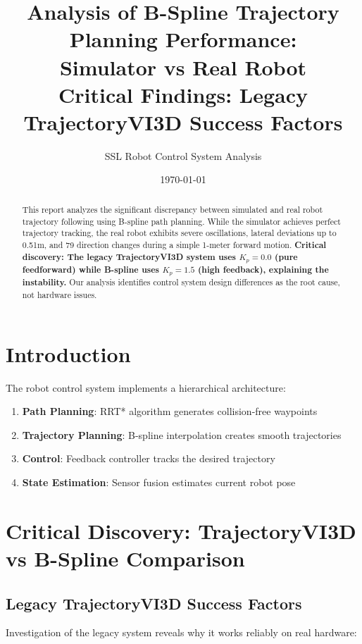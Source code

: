 \documentclass[12pt,a4paper]{article}
\title{Analysis of B-Spline Trajectory Planning Performance:\\Simulator vs Real Robot\\
\large{\textbf{Critical Findings: Legacy TrajectoryVI3D Success Factors}}}
\author{SSL Robot Control System Analysis}
\date{\today}
\begin{document}
\maketitle

\begin{abstract}
This report analyzes the significant discrepancy between simulated and real robot trajectory following using B-spline path planning. While the simulator achieves perfect trajectory tracking, the real robot exhibits severe oscillations, lateral deviations up to 0.51m, and 79 direction changes during a simple 1-meter forward motion. \textbf{Critical discovery: The legacy TrajectoryVI3D system uses $K_p = 0.0$ (pure feedforward) while B-spline uses $K_p = 1.5$ (high feedback), explaining the instability.} Our analysis identifies control system design differences as the root cause, not hardware issues.
\end{abstract}

\section{Introduction}

The robot control system implements a hierarchical architecture:
\begin{enumerate}
    \item \textbf{Path Planning}: RRT* algorithm generates collision-free waypoints
    \item \textbf{Trajectory Planning}: B-spline interpolation creates smooth trajectories
    \item \textbf{Control}: Feedback controller tracks the desired trajectory
    \item \textbf{State Estimation}: Sensor fusion estimates current robot pose
\end{enumerate}

\section{Critical Discovery: TrajectoryVI3D vs B-Spline Comparison}

\subsection{Legacy TrajectoryVI3D Success Factors}

Investigation of the legacy system reveals why it works reliably on real hardware:
\end{document}
